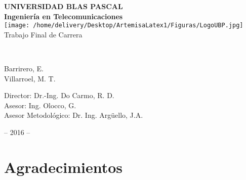 \documentclass[a4paper,12pt]{report}
\begin{document}

\renewcommand{\figurename}{\emph{Figura}} %
\renewcommand{\tablename}{Tabla} %
\renewcommand{\listtablename}{Índice de tablas}
\renewcommand\chaptername{}

\begin{titlepage}


\thispagestyle{empty}
\vspace*{1cm}

{\centering     

\Large
{\Huge\bf UNIVERSIDAD BLAS PASCAL}\\
\vspace{1.3cm}
{\bf Ingeniería en Telecomunicaciones}\\
\vspace{1cm}
\texttt{[image: /home/delivery/Desktop/ArtemisaLatex1/Figuras/LogoUBP.jpg]} \\
\vspace{1cm}
Trabajo Final de Carrera \\
\vspace{1cm}

{\bf
\setlength{\fboxrule}{1pt}
\setlength{\fboxsep}{0.35cm}
\\}
 
\vspace{1cm}
\large
Barrirero, E.\\
Villarroel, M. T.

}

\vspace{1cm}
\large
\noindent 
Director: Dr.-Ing. Do Carmo, R. D.\\
Asesor: Ing. Olocco, G.\\
Asesor Metodológico: Dr. Ing. Argüello, J.A.\\

{

\centering 
\vspace{0.5cm}
-- 2016 --

}


\end{titlepage}


\newpage

\chapter*{Agradecimientos}
\end{document}
